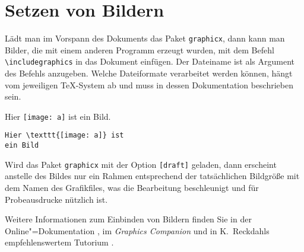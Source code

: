 
\section{Setzen von Bildern} \label{graphics}
Lädt man im Vorspann des Dokuments das Paket \texttt{graphicx},
dann kann man Bilder, die mit einem anderen Programm erzeugt wurden, 
mit dem Befehl \verb|\includegraphics| in das Dokument einfügen.
Der Dateiname ist als Argument des Befehls anzugeben.
Welche Dateiformate verarbeitet werden können, hängt vom jeweiligen
\TeX-System ab und muss in dessen Dokumentation beschrieben sein.

\exa
Hier \texttt{[image: a]} ist ein Bild.
\exb
\begin{verbatim}
Hier \texttt{[image: a]} ist
ein Bild
\end{verbatim}
\exc
Wird das Paket \texttt{graphicx} mit der Option \texttt{[draft]} geladen,
dann erscheint anstelle des Bildes nur ein Rahmen entsprechend
der tatsächlichen Bildgröße mit dem Namen des Grafikfiles, 
was die Bearbeitung beschleunigt und für Probeausdrucke nützlich ist.

Weitere Informationen zum Einbinden von Bildern finden Sie in der
Online"=Dokumentation \cite{grfguide}, im \textit{Graphics Companion}
\cite{grfcomp} und in K.~Reckdahls empfehlenswertem  Tutorium \cite{epslatex}.




